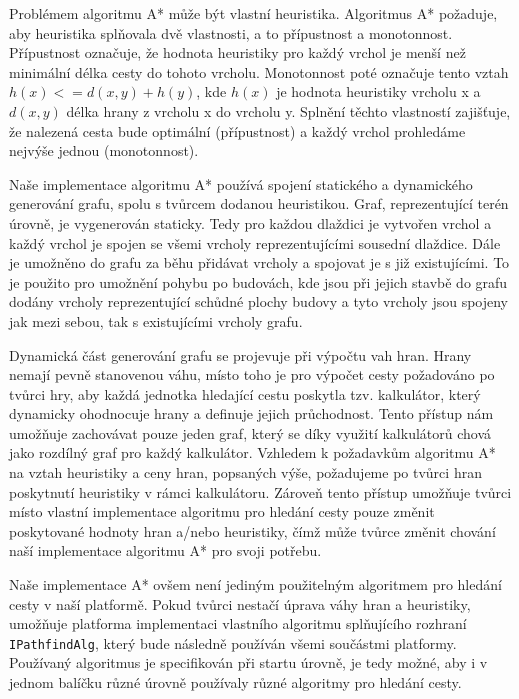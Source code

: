 Problémem algoritmu A* může být vlastní heuristika. Algoritmus A* požaduje, aby heuristika splňovala dvě vlastnosti, a to přípustnost a monotonnost. Přípustnost označuje, že hodnota heuristiky pro každý vrchol je menší než minimální délka cesty do tohoto vrcholu. Monotonnost poté označuje tento vztah \(h(x) <= d(x,y) + h(y)\), kde \(h(x)\) je hodnota heuristiky vrcholu x a \(d(x,y)\) délka hrany z vrcholu x do vrcholu y. Splnění těchto vlastností zajišťuje, že nalezená cesta bude optimální (přípustnost) a každý vrchol prohledáme nejvýše jednou (monotonnost). 

Naše implementace algoritmu A* používá spojení statického a dynamického generování grafu, spolu s tvůrcem dodanou heuristikou. Graf, reprezentující terén úrovně, je vygenerován staticky. Tedy pro každou dlaždici je vytvořen vrchol a každý vrchol je spojen se všemi vrcholy reprezentujícími sousední dlaždice. Dále je umožněno do grafu za běhu přidávat vrcholy a spojovat je s již existujícími. To je použito pro umožnění pohybu po budovách, kde jsou při jejich stavbě do grafu dodány vrcholy reprezentující schůdné plochy budovy a tyto vrcholy jsou spojeny jak mezi sebou, tak s existujícími vrcholy grafu. 

Dynamická část generování grafu se projevuje při výpočtu vah hran. Hrany nemají pevně stanovenou váhu, místo toho je pro výpočet cesty požadováno po tvůrci hry, aby každá jednotka hledající cestu poskytla tzv. kalkulátor, který dynamicky ohodnocuje hrany a definuje jejich průchodnost. Tento přístup nám umožňuje zachovávat pouze jeden graf, který se díky využití kalkulátorů chová jako rozdílný graf pro každý kalkulátor. 
Vzhledem k požadavkům algoritmu A* na vztah heuristiky a ceny hran, popsaných výše, požadujeme po tvůrci hran poskytnutí heuristiky v rámci kalkulátoru. Zároveň tento přístup umožňuje tvůrci místo vlastní implementace algoritmu pro hledání cesty pouze změnit poskytované hodnoty hran a/nebo heuristiky, čímž může tvůrce změnit chování naší implementace algoritmu A* pro svoji potřebu.


Naše implementace A* ovšem není jediným použitelným algoritmem pro hledání cesty v naší platformě. Pokud tvůrci nestačí úprava váhy hran a heuristiky, umožňuje platforma implementaci vlastního algoritmu splňujícího rozhraní \texttt{IPathfindAlg}, který bude následně používán všemi součástmi platformy. Používaný algoritmus je specifikován při startu úrovně, je tedy možné, aby i v jednom balíčku různé úrovně používaly různé algoritmy pro hledání cesty.

